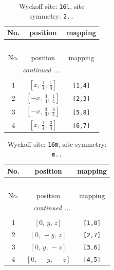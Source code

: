 \documentclass[fleqn,8pt]{jsarticle}
\begin{document}
\renewcommand{\arraystretch}{1.2}
\begin{longtable}{ccc}
\caption{Wyckoff site: {\tt 16l}, site symmetry: {\tt 2..}}
 \\
 \hline \hline
No. & position & mapping \\ \hline \endfirsthead

\multicolumn{2}{l}{\tablename\ \thetable{}} \\
 \hline \hline
No. & position & mapping \\ \hline \endhead

 \hline \hline
\multicolumn{2}{r}{\footnotesize\it continued ...} \\ \endfoot

 \hline \hline
\multicolumn{2}{r}{} \\ \endlastfoot

1 & $\left[ x,\, \frac{1}{4},\, \frac{1}{4} \right]$ & {\tt [1,4]} \\ \hline
2 & $\left[ - x,\, \frac{3}{4},\, \frac{1}{4} \right]$ & {\tt [2,3]} \\ \hline
3 & $\left[ - x,\, \frac{3}{4},\, \frac{3}{4} \right]$ & {\tt [5,8]} \\ \hline
4 & $\left[ x,\, \frac{1}{4},\, \frac{3}{4} \right]$ & {\tt [6,7]} \\
\end{longtable}
\renewcommand{\arraystretch}{1.2}
\begin{longtable}{ccc}
\caption{Wyckoff site: {\tt 16m}, site symmetry: {\tt m..}}
 \\
 \hline \hline
No. & position & mapping \\ \hline \endfirsthead

\multicolumn{2}{l}{\tablename\ \thetable{}} \\
 \hline \hline
No. & position & mapping \\ \hline \endhead

 \hline \hline
\multicolumn{2}{r}{\footnotesize\it continued ...} \\ \endfoot

 \hline \hline
\multicolumn{2}{r}{} \\ \endlastfoot

1 & $\left[ 0,\, y,\, z \right]$ & {\tt [1,8]} \\ \hline
2 & $\left[ 0,\, - y,\, z \right]$ & {\tt [2,7]} \\ \hline
3 & $\left[ 0,\, y,\, - z \right]$ & {\tt [3,6]} \\ \hline
4 & $\left[ 0,\, - y,\, - z \right]$ & {\tt [4,5]} \\
\end{longtable}
\end{document}

